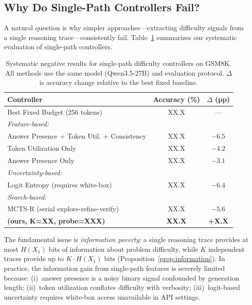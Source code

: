 
\subsection{Why Do Single-Path Controllers Fail?}
\label{sec:analysis:single_path}

A natural question is why simpler approaches---extracting difficulty signals from a single reasoning trace---consistently fail.
Table~\ref{tab:negative_results} summarizes our systematic evaluation of single-path controllers.

\begin{table}[h]
\centering
\caption{Systematic negative results for single-path difficulty controllers on GSM8K.
All methods use the same model (Qwen3.5-27B) and evaluation protocol.
$\Delta$ is accuracy change relative to the best fixed baseline.}
\label{tab:negative_results}
\begin{tabular}{lcc}
\toprule
Controller & Accuracy (\%) & $\Delta$ (pp) \\
\midrule
Best Fixed Budget (256 tokens) & XX.X & --- \\
\midrule
\textit{Feature-based:} \\
\quad Answer Presence + Token Util. + Consistency & XX.X & $-6.5$ \\
\quad Token Utilization Only & XX.X & $-4.2$ \\
\quad Answer Presence Only & XX.X & $-3.1$ \\
\midrule
\textit{Uncertainty-based:} \\
\quad Logit Entropy (requires white-box) & XX.X & $-6.4$ \\
\midrule
\textit{Search-based:} \\
\quad MCTS-R (serial explore-refine-verify) & XX.X & $-5.6$ \\
\midrule
\textbf{\method{} (ours, K=XX, probe=XXX)} & \textbf{XX.X} & \textbf{+X.X} \\
\bottomrule
\end{tabular}
\end{table}

The fundamental issue is \emph{information poverty}: a single reasoning trace provides at most $H(X_1)$ bits of information about problem difficulty, while $K$ independent traces provide up to $K \cdot H(X_1)$ bits (Proposition~\ref{prop:information}).
In practice, the information gain from single-path features is severely limited because:
(i)~answer presence is a noisy binary signal confounded by generation length;
(ii)~token utilization conflates difficulty with verbosity;
(iii)~logit-based uncertainty requires white-box access unavailable in API settings.

